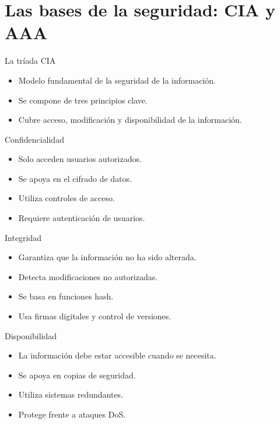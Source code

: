 \documentclass{beamer}
\begin{document}

\section{Las bases de la seguridad: CIA y AAA}

\begin{frame}{La tríada CIA}
\begin{itemize}
    \item Modelo fundamental de la seguridad de la información.
    \item Se compone de tres principios clave.
    \item Cubre acceso, modificación y disponibilidad de la información.
\end{itemize}
\end{frame}

\begin{frame}{Confidencialidad}
\begin{itemize}
    \item Solo acceden usuarios autorizados.
    \item Se apoya en el cifrado de datos.
    \item Utiliza controles de acceso.
    \item Requiere autenticación de usuarios.
\end{itemize}
\end{frame}

\begin{frame}{Integridad}
\begin{itemize}
    \item Garantiza que la información no ha sido alterada.
    \item Detecta modificaciones no autorizadas.
    \item Se basa en funciones hash.
    \item Usa firmas digitales y control de versiones.
\end{itemize}
\end{frame}

\begin{frame}{Disponibilidad}
\begin{itemize}
    \item La información debe estar accesible cuando se necesita.
    \item Se apoya en copias de seguridad.
    \item Utiliza sistemas redundantes.
    \item Protege frente a ataques DoS.
\end{itemize}
\end{frame}
\end{document}
